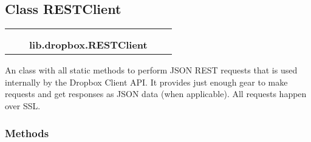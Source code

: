 \subsection{Class RESTClient}

    \label{lib:dropbox:RESTClient}
\begin{tabular}{cccccc}
\multicolumn{2}{r}{\settowidth{\BCL}{object}\multirow{2}{\BCL}{object}}
&&
  \\\cline{3-3}
  &&\multicolumn{1}{c|}{}
&&
  \\
&&\multicolumn{2}{l}{\textbf{lib.dropbox.RESTClient}}
\end{tabular}

An class with all static methods to perform JSON REST requests that is used
internally by the Dropbox Client API. It provides just enough gear to make 
requests and get responses as JSON data (when applicable). All requests 
happen over SSL.



  \subsubsection{Methods}

    \label{lib:dropbox:RESTClient:request}

    \vspace{0.5ex}

